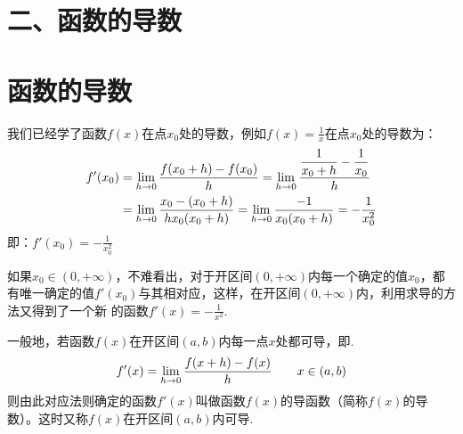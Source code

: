 \section*{二、函数的导数}

\section{函数的导数}

我们已经学了函数$f(x)$在点$x_0$处的导数，例如$f(x)=\frac{1}{x}$在点$x_0$处的导数为：
\[\begin{split}
f'(x_0)&=\lim\limits_{h\to 0}\dfrac{f(x_0+h)-f(x_0)}{h}=\lim\limits_{h\to 0}\dfrac{\dfrac{1}{x_0+h}-\dfrac{1}{x_0}}{h}\\
&=\lim\limits_{h\to 0}\dfrac{x_0-(x_0+h)}{hx_0(x_0+h)}=\lim\limits_{h\to 0}\dfrac{-1}{x_0(x_0+h)}=-\dfrac{1}{x^2_0}
\end{split}\]
即：$f'(x_0)=-\frac{1}{x^2_0}$

如果$x_0\in (0,+\infty)$，不难看出，对于开区间$(0,+\infty)$内每一个确定的值$x_0$，都有唯一确定的值$f'(x_0)$与其相对应，这样，在开区间$(0,+\infty)$内，利用求导的方法又得到了一个新
的函数$f'(x)=-\frac{1}{x^2}$.

一般地，若函数$f(x)$在开区间$(a,b)$内每一点$x$处都可导，即.
\[f'(x)=\lim\limits_{h\to 0}\dfrac{f(x+h)-f(x)}{h}\qquad x\in(a,b)\]
则由此对应法则确定的函数$f'(x)$叫做函数$f(x)$的导函数（简称$f(x)$的导数）。这时又称$f(x)$在开区间$(a,b)$内可导.

